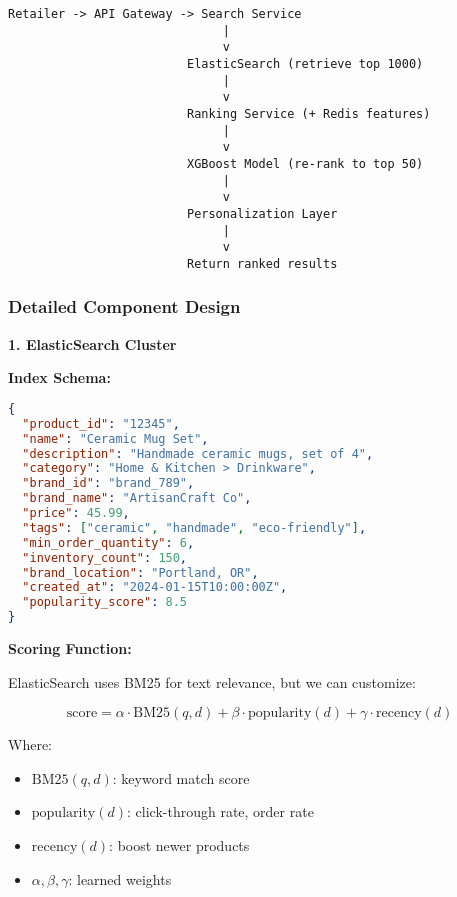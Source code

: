 \documentclass[11pt,letterpaper]{article}
\begin{document}
\begin{verbatim}
Retailer -> API Gateway -> Search Service
                              |
                              v
                         ElasticSearch (retrieve top 1000)
                              |
                              v
                         Ranking Service (+ Redis features)
                              |
                              v
                         XGBoost Model (re-rank to top 50)
                              |
                              v
                         Personalization Layer
                              |
                              v
                         Return ranked results
\end{verbatim}

\subsubsection{Detailed Component Design}

\textbf{1. ElasticSearch Cluster}

\textbf{Index Schema:}
\begin{lstlisting}[language=json]
{
  "product_id": "12345",
  "name": "Ceramic Mug Set",
  "description": "Handmade ceramic mugs, set of 4",
  "category": "Home & Kitchen > Drinkware",
  "brand_id": "brand_789",
  "brand_name": "ArtisanCraft Co",
  "price": 45.99,
  "tags": ["ceramic", "handmade", "eco-friendly"],
  "min_order_quantity": 6,
  "inventory_count": 150,
  "brand_location": "Portland, OR",
  "created_at": "2024-01-15T10:00:00Z",
  "popularity_score": 8.5
}
\end{lstlisting}

\textbf{Scoring Function:}

ElasticSearch uses BM25 for text relevance, but we can customize:

\begin{equation}
\text{score} = \alpha \cdot \text{BM25}(q, d) + \beta \cdot \text{popularity}(d) + \gamma \cdot \text{recency}(d)
\end{equation}

Where:
\begin{itemize}
    \item $\text{BM25}(q, d)$: keyword match score
    \item $\text{popularity}(d)$: click-through rate, order rate
    \item $\text{recency}(d)$: boost newer products
    \item $\alpha, \beta, \gamma$: learned weights
\end{itemize}
\end{document}
